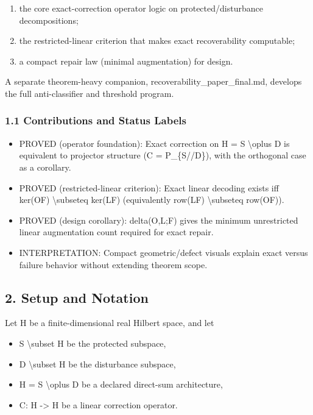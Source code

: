 \documentclass[11pt]{article}
\begin{document}
\begin{enumerate}
\item the core exact-correction operator logic on protected/disturbance decompositions;
\item the restricted-linear criterion that makes exact recoverability computable;
\item a compact repair law (minimal augmentation) for design.
\end{enumerate}

A separate theorem-heavy companion, recoverability\_paper\_final.md, develops the full anti-classifier and threshold program.


\subsubsection*{1.1 Contributions and Status Labels}
\begin{itemize}
\item PROVED (operator foundation): Exact correction on H = S \textbackslash{}oplus D is equivalent to projector structure (C = P\_\{S//D\}), with the orthogonal case as a corollary.
\item PROVED (restricted-linear criterion): Exact linear decoding exists iff ker(OF) \textbackslash{}subseteq ker(LF) (equivalently row(LF) \textbackslash{}subseteq row(OF)).
\item PROVED (design corollary): delta(O,L;F) gives the minimum unrestricted linear augmentation count required for exact repair.
\item INTERPRETATION: Compact geometric/defect visuals explain exact versus failure behavior without extending theorem scope.
\end{itemize}

\subsection*{2. Setup and Notation}
Let H be a finite-dimensional real Hilbert space, and let

\begin{itemize}
\item S \textbackslash{}subset H be the protected subspace,
\item D \textbackslash{}subset H be the disturbance subspace,
\item H = S \textbackslash{}oplus D be a declared direct-sum architecture,
\item C: H -> H be a linear correction operator.
\end{itemize}
\end{document}
